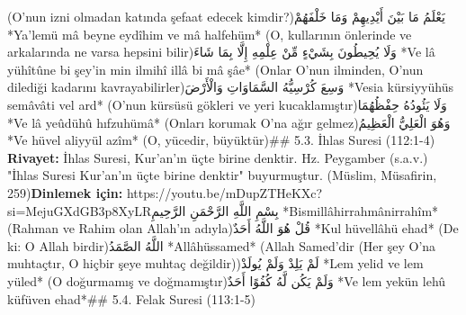 \documentclass[12pt,a4paper]{article}
\begin{document}
(O'nun izni olmadan katında şefaat edecek kimdir?)يَعْلَمُ مَا بَيْنَ أَيْدِيهِمْ وَمَا خَلْفَهُمْ
*Ya'lemü mâ beyne eydîhim ve mâ halfehüm*
(O, kullarının önlerinde ve arkalarında ne varsa hepsini bilir)وَلَا يُحِيطُونَ بِشَيْءٍ مِّنْ عِلْمِهِ إِلَّا بِمَا شَاءَ
*Ve lâ yühîtûne bi şey'in min ilmihî illâ bi mâ şâe*
(Onlar O'nun ilminden, O'nun dilediği kadarını kavrayabilirler)وَسِعَ كُرْسِيُّهُ السَّمَاوَاتِ وَالْأَرْضَ
*Vesia kürsiyyühüs semâvâti vel ard*
(O'nun kürsüsü gökleri ve yeri kucaklamıştır)وَلَا يَئُودُهُ حِفْظُهُمَا
*Ve lâ yeûdühû hıfzuhümâ*
(Onları korumak O'na ağır gelmez)وَهُوَ الْعَلِيُّ الْعَظِيمُ
*Ve hüvel aliyyül azîm*
(O, yücedir, büyüktür)\#\# 5.3. İhlas Suresi (112:1-4)
\textbf{Rivayet:} İhlas Suresi, Kur'an'ın üçte birine denktir. Hz. Peygamber (s.a.v.) "İhlas Suresi Kur'an'ın üçte birine denktir" buyurmuştur. (Müslim, Müsafirin, 259)\textbf{Dinlemek için:} https://youtu.be/mDupZTHeKXc?si=MejuGXdGB3p8XyLRبِسْمِ اللَّهِ الرَّحْمَنِ الرَّحِيمِ
*Bismillâhirrahmânirrahîm*
(Rahman ve Rahim olan Allah'ın adıyla)قُلْ هُوَ اللَّهُ أَحَدٌ
*Kul hüvellâhü ehad*
(De ki: O Allah birdir)اللَّهُ الصَّمَدُ
*Allâhüssamed*
(Allah Samed'dir (Her şey O'na muhtaçtır, O hiçbir şeye muhtaç değildir))لَمْ يَلِدْ وَلَمْ يُولَدْ
*Lem yelid ve lem yüled*
(O doğurmamış ve doğmamıştır)وَلَمْ يَكُن لَّهُ كُفُوًا أَحَدٌ
*Ve lem yekün lehû küfüven ehad*\#\# 5.4. Felak Suresi (113:1-5)
\end{document}
